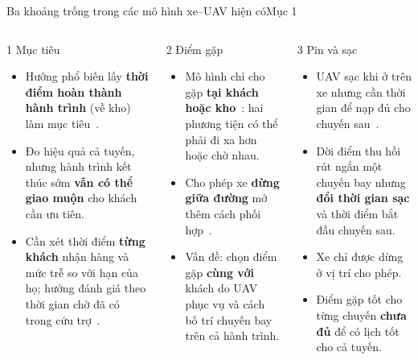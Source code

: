 \documentclass[aspectratio=169,10pt,t,xcolor={table}]{beamer}
\newcommand{\src}[1]{\hfill{\normalfont\footnotesize\color{white!62!navy}#1}}  %
\begin{document}
\begin{frame}{Ba khoảng trống trong các mô hình xe--UAV hiện có\src{Mục 1}}
\small
\begin{columns}[T,onlytextwidth]
\begin{block}{1 \textperiodcentered{} Mục tiêu}
\footnotesize
\begin{itemize}
\item Hướng phổ biến lấy \textbf{thời điểm hoàn thành hành trình} (về kho) làm mục tiêu~\cite{agatz2018,hgatac2024,lee2025}.
\item Đo hiệu quả cả tuyến, nhưng hành trình kết thúc sớm \textbf{vẫn có thể giao muộn} cho khách cần ưu tiên.
\item Cần xét thời điểm \textbf{từng khách} nhận hàng và mức trễ so với hạn của họ; hướng đánh giá theo thời gian chờ đã có trong cứu trợ~\cite{tureci2026}.
\end{itemize}
\end{block}
\begin{block}{2 \textperiodcentered{} Điểm gặp}
\footnotesize
\begin{itemize}
\item Mô hình chỉ cho gặp \textbf{tại khách hoặc kho}~\cite{agatz2018,hgatac2024}: hai phương tiện có thể phải đi xa hơn hoặc chờ nhau.
\item Cho phép xe \textbf{dừng giữa đường} mở thêm cách phối hợp~\cite{marinelli2018,masone2022}.
\item Vấn đề: chọn điểm gặp \textbf{cùng với} khách do UAV phục vụ và cách bố trí chuyến bay trên cả hành trình.
\end{itemize}
\end{block}
\begin{block}{3 \textperiodcentered{} Pin và sạc}
\footnotesize
\begin{itemize}
\item UAV sạc khi ở trên xe nhưng cần thời gian để nạp đủ cho chuyến sau~\cite{tamke}.
\item Dời điểm thu hồi rút ngắn một chuyến bay nhưng \textbf{đổi thời gian sạc} và thời điểm bắt đầu chuyến sau.
\item Xe chỉ được dừng ở vị trí cho phép.
\item[$\Rightarrow$] Điểm gặp tốt cho từng chuyến \textbf{chưa đủ} để có lịch tốt cho cả tuyến.
\end{itemize}
\end{block}
\end{columns}
\end{frame}
\end{document}
